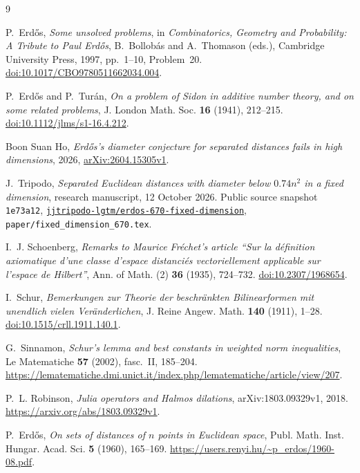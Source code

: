 \documentclass[11pt]{amsart}
\numberwithin{equation}{section}
\theoremstyle{definition}
\theoremstyle{remark}
\newcommand{\TripodoCommit}{\texttt{1e73a12}}
\begin{document}
\begin{thebibliography}{9}
\enlargethispage{3\baselineskip}

P.~Erd\H{o}s,
\emph{Some unsolved problems},
in \emph{Combinatorics, Geometry and Probability: A Tribute to Paul Erd\H{o}s},
B.~Bollob\'as and A.~Thomason (eds.),
Cambridge University Press, 1997, pp.~1--10, Problem~20.
\href{https://doi.org/10.1017/CBO9780511662034.004}{doi:10.1017/CBO9780511662034.004}.

P.~Erd\H{o}s and P.~Tur\'an,
\emph{On a problem of Sidon in additive number theory, and on some related problems},
J. London Math. Soc. \textbf{16} (1941), 212--215.
\href{https://doi.org/10.1112/jlms/s1-16.4.212}{doi:10.1112/jlms/s1-16.4.212}.

Boon Suan Ho,
\emph{Erd\H{o}s's diameter conjecture for separated distances fails in high dimensions},
2026, \href{https://arxiv.org/abs/2604.15305v1}{arXiv:2604.15305v1}.

J.~Tripodo,
\emph{Separated Euclidean distances with diameter below $0.74n^2$ in a fixed dimension},
research manuscript, 12 October 2026.
Public source snapshot \TripodoCommit,
\href{https://github.com/jjtripodo-lgtm/erdos-670-fixed-dimension/tree/1e73a12ff1076dd11affadbf619ddbbef587133e}{\texttt{jjtripodo-lgtm/erdos-670-fixed-dimension}},
\texttt{paper/fixed\_dimension\_670.tex}.

I.~J. Schoenberg,
\emph{Remarks to Maurice Fr\'echet's article ``Sur la d\'efinition axiomatique d'une classe d'espace distanci\'es vectoriellement applicable sur l'espace de Hilbert''},
Ann. of Math. (2) \textbf{36} (1935), 724--732.
\href{https://doi.org/10.2307/1968654}{doi:10.2307/1968654}.

I.~Schur,
\emph{Bemerkungen zur Theorie der beschr\"ankten Bilinearformen mit unendlich vielen Ver\"anderlichen},
J. Reine Angew. Math. \textbf{140} (1911), 1--28.
\href{https://doi.org/10.1515/crll.1911.140.1}{doi:10.1515/crll.1911.140.1}.

G.~Sinnamon,
\emph{Schur's lemma and best constants in weighted norm inequalities},
Le Matematiche \textbf{57} (2002), fasc.~II, 185--204.
\url{https://lematematiche.dmi.unict.it/index.php/lematematiche/article/view/207}.

P.~L. Robinson,
\emph{Julia operators and Halmos dilations}, arXiv:1803.09329v1, 2018.
\url{https://arxiv.org/abs/1803.09329v1}.

P.~Erd\H{o}s,
\emph{On sets of distances of $n$ points in Euclidean space},
Publ. Math. Inst. Hungar. Acad. Sci. \textbf{5} (1960), 165--169.
\url{https://users.renyi.hu/~p_erdos/1960-08.pdf}.

\end{thebibliography}
\end{document}
